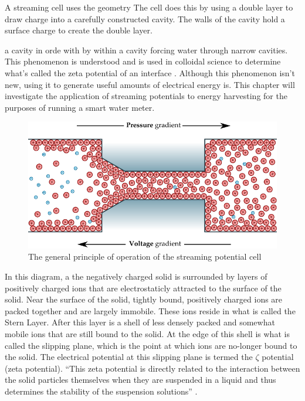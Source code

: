 A streaming cell uses the geometry
The cell does this by using a double layer to draw charge into a carefully constructed cavity.
The walls of the cavity hold a surface charge to create the double layer.

a cavity in orde with 
by within
a cavity forcing water through narrow cavities. This phenomenon is understood
and is used in colloidal science to determine what's called the zeta potential
of an interface \cite{Gu2000,Scales1992,Daiguji2004,VanderHeyden2006,Mala1997}.
Although this phenomenon isn't new, using it to generate useful amounts of
electrical energy is. This chapter will investigate the application of
streaming potentials to energy harvesting for the purposes of running a smart
water meter.



\begin{figure} \centering
    \includegraphics{content/pt1/01-PowerHarvesting/graphics/streamingCellPrinciple}
    \caption{\label{fig:streamingCellPrinciple}The general principle of
        operation of the streaming potential cell} \end{figure} In this
diagram, a the negatively charged solid is surrounded by layers of positively
charged ions that are electrostaticly attracted to the surface of the solid.
Near the surface of the solid, tightly bound, positively charged ions are
packed together and are largely immobile.  These ions reside in what is called
the Stern Layer. After this layer is a shell of less densely packed and
somewhat mobile ions that are still bound to the solid. At the edge of this
shell is what is called the slipping plane, which is the point at which ions
are no-longer bound to the solid. The electrical potential at this slipping
plane is termed the $\zeta$ potential (zeta potential). ``This zeta potential
is directly related to the interaction between the solid particles themselves
when they are suspended in a liquid and thus determines the stability of the
suspension solutions'' \cite{Gu2000}.

